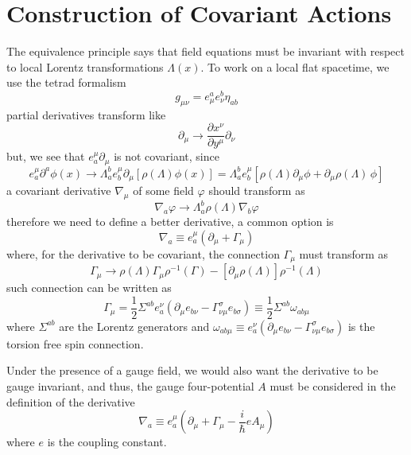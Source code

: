 \section{Construction of Covariant Actions}
The equivalence principle says that field equations must be invariant with respect to local Lorentz transformations $\Lambda(x)$. To work on a local flat spacetime, we use the tetrad formalism
\begin{equation}
	g_{\mu\nu}=e^a_\mu e^b_\nu \eta_{ab}
\end{equation}
partial derivatives transform like
\begin{equation}
	\partial_\mu\to\frac{\partial x^\nu}{\partial y^\mu}\partial_\nu
\end{equation}
but, we see that $e^\mu_a\partial_\mu$ is not covariant, since
\begin{equation}
	e^\mu_a\partial^a\phi(x)\to \Lambda^b_ae^\mu_b\partial_\mu\left[\rho\left(\Lambda\right)\phi(x)\right]= \Lambda^b_ae^\mu_b\left[\rho\left(\Lambda\right)\partial_\mu\phi+\partial_\mu\rho\left(\Lambda\right)\,\phi\right]
\end{equation}
a covariant derivative $\nabla_\mu$ of some field $\varphi$ should transform as
\begin{equation}
	\nabla_a\varphi\to\Lambda_a^b\rho\left(\Lambda\right)\nabla_b\varphi
\end{equation}
therefore we need to define a better derivative, a common option is
\begin{equation}
	\nabla_a\equiv e^\mu_a\left(\partial_\mu+\Gamma_\mu\right)
\end{equation}
where, for the derivative to be covariant, the connection $\Gamma_\mu$ must transform as
\begin{equation}
	\Gamma_\mu\to \rho\left(\Lambda\right)\Gamma_\mu\rho^{-1}\left(\Gamma\right)-\left[\partial_\mu\rho\left(\Lambda\right)\right]\rho^{-1}\left(\Lambda\right)
\end{equation} 
such connection can be written as
\begin{equation}
	\Gamma_\mu=\frac{1}{2}\Sigma^{ab}e^\nu_a\left(\partial_\mu e_{b\nu}-\Gamma^\sigma_{\nu\mu}e_{b\sigma}\right)\equiv \frac{1}{2}\Sigma^{ab}\omega_{ab\mu}
\end{equation}
where $\Sigma^{ab}$ are the Lorentz generators and $\omega_{ab\mu}\equiv e^\nu_a\left(\partial_\mu e_{b\nu}-\Gamma^\sigma_{\nu\mu}e_{b\sigma}\right)$ is the torsion free spin connection.

Under the presence of a gauge field, we would also want the derivative to be gauge invariant, and thus, the gauge four-potential $A$ must be considered in the definition of the derivative
\begin{equation}\label{eq: Covariant derivative}
	\nabla_a\equiv e^\mu_a\left(\partial_\mu+\Gamma_\mu-\frac{i}{\hbar}eA_\mu\right)
\end{equation}
where $e$ is the coupling constant.
